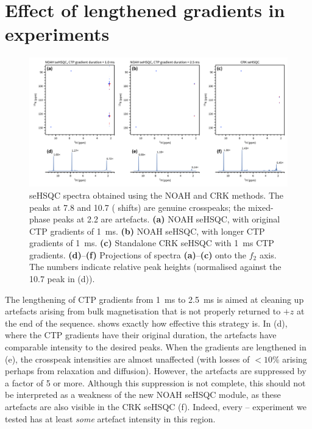 \section{Effect of lengthened gradients in \texorpdfstring{\nitrogen{}}{15N} experiments}

\begin{figure}
    \centering
    \includegraphics[width=\textwidth]{./figures/cnst16_diff.png}
    \caption{
        \nitrogen{} seHSQC spectra obtained using the NOAH and CRK methods.
        The peaks at 7.8 and \SI{10.7}{\ppm} (\proton{} shifts) are genuine crosspeaks; the mixed-phase peaks at \SI{2.2}{\ppm} are artefacts.
        \textbf{(a)} NOAH seHSQC, with original CTP gradients of \SI{1}{\ms}.
        \textbf{(b)} NOAH seHSQC, with longer CTP gradients of \SI{1}{\ms}.
        \textbf{(c)} Standalone CRK seHSQC with \SI{1}{\ms} CTP gradients.
        \textbf{(d)}--\textbf{(f)} Projections of spectra \textbf{(a)}--\textbf{(c)} onto the $f_2$ axis.
        The numbers indicate relative peak heights (normalised against the \SI{10.7}{\ppm} peak in (d)).
        \zolmi{}
    }
    \label{fig:cnst16_diff}
\end{figure}

The lengthening of CTP gradients from \SI{1}{\ms} to \SI{2.5}{\ms} is aimed at cleaning up artefacts arising from bulk magnetisation that is not properly returned to $+z$ at the end of the sequence.
 shows exactly how effective this strategy is.
In (d), where the CTP gradients have their original duration, the artefacts have comparable intensity to the desired peaks.
When the gradients are lengthened in (e), the crosspeak intensities are almost unaffected (with losses of $<10\%$ arising perhaps from relaxation and diffusion).
However, the artefacts are suppressed by a factor of 5 or more.
Although this suppression is not complete, this should not be interpreted as a weakness of the new NOAH seHSQC module, as these artefacts are also visible in the CRK seHSQC (f).
Indeed, every \nitrogen{}--\proton{} experiment we tested has at least \textit{some} artefact intensity in this region.

